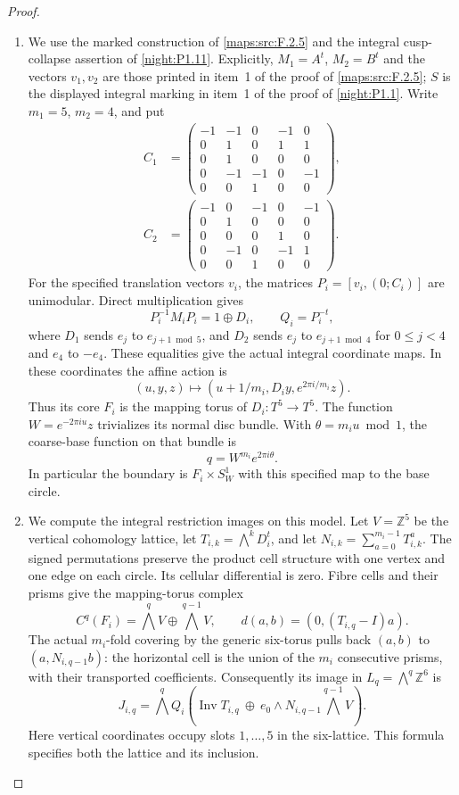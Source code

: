\begin{proof}
\begin{enumerate}[label=\arabic*.]
\item We use the marked construction of \cref{maps:src:F.2.5} and the
integral cusp-collapse assertion of \cref{night:P1.11}.
Explicitly, $M_1=A^t$, $M_2=B^t$ and the vectors $v_1,v_2$ are
those printed in item~1 of the proof of \cref{maps:src:F.2.5};
$S$ is the displayed integral marking in item~1 of the proof of
\cref{night:P1.1}.  Write
$m_1=5$, $m_2=4$, and put
\[
\begin{split}
C_1&=\begin{pmatrix}
-1&-1&0&-1&0\\0&1&0&1&1\\0&1&0&0&0\\
0&-1&-1&0&-1\\0&0&1&0&0
\end{pmatrix},\\[2pt]
C_2&=\begin{pmatrix}
-1&0&-1&0&-1\\0&1&0&0&0\\0&0&0&1&0\\
0&-1&0&-1&1\\0&0&1&0&0
\end{pmatrix}.
\end{split}
\]
For the specified translation vectors $v_i$, the matrices
$P_i=[v_i,(0;C_i)]$ are unimodular.  Direct multiplication gives
\[
 P_i^{-1}M_iP_i=1\oplus D_i,\qquad Q_i=P_i^{-t},
\]
where $D_1$ sends $e_j$ to $e_{j+1\bmod5}$, and $D_2$ sends
$e_j$ to $e_{j+1\bmod4}$ for $0\le j<4$ and $e_4$ to $-e_4$.
These equalities give the actual integral coordinate maps.  In these
coordinates the affine action is
\[
 (u,y,z)\longmapsto
 (u+1/m_i,D_i y,e^{2\pi i/m_i}z).
\]
Thus its core $F_i$ is the mapping torus of $D_i:T^5\to T^5$.
The function $W=e^{-2\pi i u}z$ trivializes its normal disc bundle.
With $\theta=m_i u\bmod1$, the coarse-base function on that bundle is
\[
                  q=W^{m_i}e^{2\pi i\theta}.
\]
In particular the boundary is $F_i\times S^1_W$ with this specified
map to the base circle.

\item We compute the integral restriction images on this model.
Let $V=\mathbb Z^5$ be the vertical cohomology lattice, let
$T_{i,k}=\bigwedge^kD_i^t$, and let
$N_{i,k}=\sum_{a=0}^{m_i-1}T_{i,k}^{a}$.
The signed permutations preserve the product cell structure with one
vertex and one edge on each circle.  Its cellular differential is zero.
Fibre cells and their prisms give the mapping-torus complex
\[
 C^q(F_i)=\bigwedge^qV\oplus\bigwedge^{q-1}V,
 \qquad d(a,b)=(0,(T_{i,q}-I)a).
\]
The actual $m_i$-fold covering by the generic six-torus pulls back
$(a,b)$ to $(a,N_{i,q-1}b)$: the horizontal cell is the union of the
$m_i$ consecutive prisms, with their transported coefficients.
Consequently its image in $L_q=\bigwedge^q\mathbb Z^6$ is
\[
 J_{i,q}=\bigwedge^q Q_i
 \left(\operatorname{Inv}T_{i,q}\ \oplus\
 e_0\wedge N_{i,q-1}\bigwedge^{q-1}V\right).
\]
Here vertical coordinates occupy slots $1,\ldots,5$ in the six-lattice.
This formula specifies both the lattice and its inclusion.


\end{enumerate}
\end{proof}
